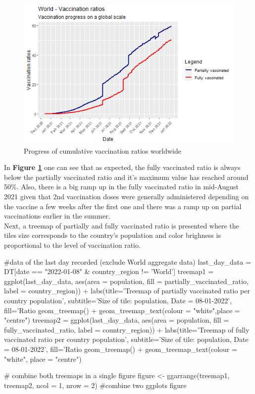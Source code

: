 \begin{figure}[h]
    \centering
    \includegraphics[width=12cm]{figures/World - vacc ratios (partially & fully).png}
    \caption{Progress of cumulative vaccination ratios worldwide}
    \label{fig:world_ratios_progress}
\end{figure}
\FloatBarrier %

In \textbf{Figure \ref{fig:world_ratios_progress}} one can see that as expected, the fully vaccinated ratio is always below the partially vaccinated ratio and it's maximum value has reached around 50\%. Also, there is a big ramp up in the fully vaccinated ratio in mid-August 2021 given that 2nd vaccination doses were generally administered depending on the vaccine a few weeks after the first one and there was a ramp up on partial vaccinations earlier in the summer.
\\
Next, a treemap of partially and fully vaccinated ratio is presented where the tiles size corresponds to the country's population and color brighness is proportional to the level of vaccination ratio.

\begin{Rcode}{\scriptsize}
#data of the last day recorded (exclude World aggregate data)
last_day_data = DT[date == "2022-01-08" & country_region != 'World'] 
treemap1 = ggplot(last_day_data, aes(area = population, 
                  fill = partially_vaccinated_ratio, label = country_region)) +
  labs(title='Treemap of partially vaccinated ratio per country population',
       subtitle='Size of tile: population, Date = 08-01-2022', fill='Ratio %
  geom_treemap() + geom_treemap_text(colour = "white",place = "centre")
treemap2 = ggplot(last_day_data, aes(area = population,
                  fill = fully_vaccinated_ratio, label = country_region)) +
  labs(title='Treemap of fully vaccinated ratio per country population',
       subtitle='Size of tile: population, Date = 08-01-2022', fill='Ratio %
  geom_treemap() + geom_treemap_text(colour = "white", place = "centre") 

# combine both treemaps in a single figure
figure <- ggarrange(treemap1, treemap2, ncol = 1, nrow = 2) #combine two ggplots
figure
\end{Rcode}

